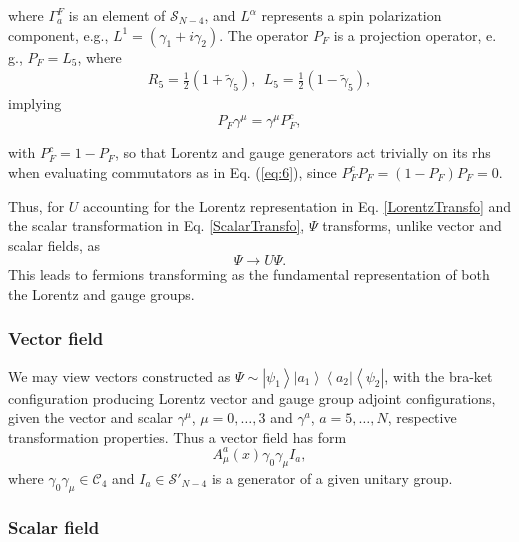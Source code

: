 \documentclass[12pt]{article}
\renewcommand\[{\begin{dmath}}
\renewcommand\]{\end{dmath}}
\begin{document}
\noindent where $\Gamma_{a}^{F}$ is an element of $ \mathcal{S}_{N-4} $,
and $L^{\alpha}$ represents a spin polarization component, e.g., $L^{1}=\left(\gamma_{1}+i\gamma_{2}\right)$.
The operator $P_{F}$ is a projection operator,  e. g.,    $P_{F}=L_5$, where
\begin{eqnarray} \label{projeRL}
  R_5=\frac{1}{2}(1+\tilde \gamma_5),  \    \  L_5=\frac{1}{2}(1-\tilde \gamma_5),
    \end{eqnarray}
implying
\begin{equation}
P_{F}\gamma^{\mu}=\gamma^{\mu}P_{F}^{c},\label{eq:17-1}
\end{equation}

\noindent with $P_{F}^{c}=1-P_{F}$,
so that Lorentz and
gauge generators act trivially on its rhs when evaluating commutators
as in Eq. (\ref{eq:6}), since $ P_F^{c}   P_F =(1- P_F ) P_F  =0$.

Thus, for $U$ accounting  for the Lorentz representation in Eq.  \ref{LorentzTransfo} and the scalar transformation in Eq. \ref{ScalarTransfo},   $\Psi$ transforms, unlike vector and scalar fields, as
\begin{equation}
\Psi\rightarrow U\Psi.\label{eq:12-1}
\end{equation} This
leads to fermions transforming as the fundamental representation of
both the Lorentz and gauge groups.




\subsubsection*{Vector field}
\noindent We may view vectors   constructed as
$\Psi\sim\left|\psi_1\right\rangle\left|a_1\right\rangle\left\langle a_2\right|\left\langle \psi_2\right|$, with the bra-ket configuration producing Lorentz  vector and gauge group adjoint   configurations, given
 the vector and scalar    $\gamma^{\mu}$, $\mu=0,\ldots,3$ and
$\gamma^{a}$, $a=5,\ldots,N$, respective transformation  properties. Thus a vector field has form
\begin{equation}
A_{\mu}^{a}(x)\gamma_{0}\gamma_{\mu}I_{a},\label{eq:14}
\end{equation}
\noindent where $\gamma_{0}\gamma_{\mu}\in\mathcal{C}_{4}$ and $I_{a}\in\mathcal{S}'_{N-4}$
is a generator of a given unitary group.

\subsubsection*{Scalar field}
\end{document}
